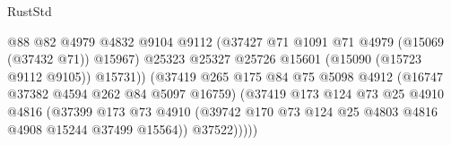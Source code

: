 \begin{lexlean}{RustStd}
\begin{coremodule}
                                            @88
                                            @82
                                            @4979
                                            @4832
                                            @9104
                                            @9112
                                            (@37427
                                              @71
                                              @1091
                                              @71
                                              @4979
                                              (@15069 (@37432 @71))
                                              @15967)
                                            @25323
                                            @25327
                                            @25726
                                            @15601
                                            (@15090 (@15723 @9112 @9105))
                                            @15731))
                                        (@37419
                                          @265
                                          @175
                                          @84
                                          @75
                                          @5098
                                          @4912
                                          (@16747 @37382 @4594 @262 @84 @5097 @16759)
                                          (@37419
                                            @173
                                            @124
                                            @73
                                            @25
                                            @4910
                                            @4816
                                            (@37399
                                              @173
                                              @73
                                              @4910
                                              (@39742
                                                @170
                                                @73
                                                @124
                                                @25
                                                @4803
                                                @4816
                                                @4908
                                                @15244
                                                @37499
                                                @15564))
                                            @37522)))))

\end{coremodule}
\end{lexlean}
